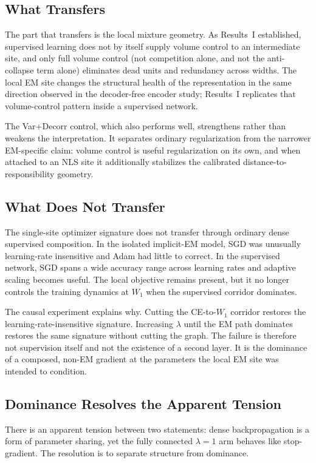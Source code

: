 \subsection{What Transfers}
The part that transfers is the local mixture geometry. As Results~I
established, supervised learning does not by itself supply volume control to
an intermediate site, and only full volume control (not competition alone, and
not the anti-collapse term alone) eliminates dead units and redundancy across
widths. The local EM site changes the structural health of the representation
in the same direction observed in the decoder-free encoder study; Results~I
replicates that volume-control pattern inside a supervised network.

The Var+Decorr control, which also performs well, strengthens rather than
weakens the interpretation. It separates ordinary regularization from the
narrower EM-specific claim: volume control is useful regularization on its
own, and when attached to an NLS site it additionally stabilizes the
calibrated distance-to-responsibility geometry.

\subsection{What Does Not Transfer}
The single-site optimizer signature does not transfer through ordinary dense
supervised composition. In the isolated implicit-EM model, SGD was unusually
learning-rate insensitive and Adam had little to correct. In the supervised
network, SGD spans a wide accuracy range across learning rates and adaptive
scaling becomes useful. The local objective remains present, but it no longer
controls the training dynamics at $W_1$ when the supervised corridor
dominates.

The causal experiment explains why. Cutting the CE-to-$W_1$ corridor restores
the learning-rate-insensitive signature. Increasing $\lambda$ until the EM
path dominates restores the same signature without cutting the graph. The
failure is therefore not supervision itself and not the existence of a second
layer. It is the dominance of a composed, non-EM gradient at the parameters
the local EM site was intended to condition.

\subsection{Dominance Resolves the Apparent Tension}
There is an apparent tension between two statements: dense backpropagation is
a form of parameter sharing, yet the fully connected $\lambda=1$ arm behaves
like stop-gradient. The resolution is to separate structure from dominance.

